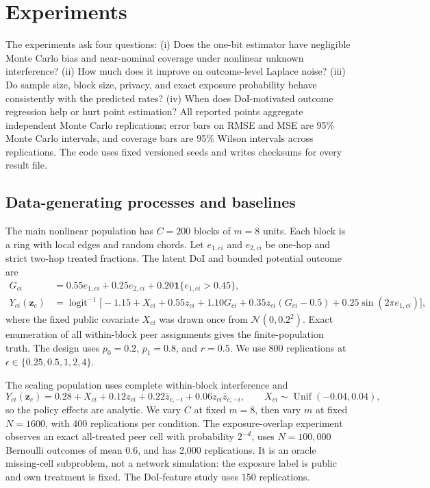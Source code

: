 \documentclass[10pt]{article}
\theoremstyle{definition}
\theoremstyle{remark}
\newcommand{\ind}{\mathbf{1}}
\begin{document}
\section{Experiments}
\label{sec:experiments}

The experiments ask four questions: (i) Does the one-bit estimator have negligible Monte Carlo
bias and near-nominal coverage under nonlinear unknown interference? (ii) How much does
it improve on outcome-level Laplace noise? (iii) Do sample size, block size, privacy, and exact
exposure probability behave consistently with the predicted rates? (iv) When does
DoI-motivated outcome regression help or hurt point estimation?
All reported points aggregate independent Monte Carlo replications; error bars on RMSE and MSE
are 95\% Monte Carlo intervals, and coverage bars are 95\% Wilson intervals across
replications. The code uses fixed versioned seeds and writes checksums for every result file.

\subsection{Data-generating processes and baselines}

The main nonlinear population has $C=200$ blocks of $m=8$ units. Each block is a ring with
local edges and random chords. Let $e_{1,ci}$ and $e_{2,ci}$ be one-hop and strict two-hop
treated fractions. The latent DoI and bounded potential outcome are
\begin{align*}
  G_{ci}&=0.55e_{1,ci}+0.25e_{2,ci}+0.20\ind\{e_{1,ci}>0.45\},\\
  Y_{ci}(\mathbf z_c)&=\operatorname{logit}^{-1}\bigl[
  -1.15+X_{ci}+0.55z_{ci}+1.10G_{ci}
  +0.35z_{ci}(G_{ci}-0.5)+0.25\sin(2\pi e_{1,ci})\bigr],
\end{align*}
where the fixed public covariate $X_{ci}$ was drawn once from $\mathcal N(0,0.2^2)$. Exact
enumeration of all within-block peer assignments gives the finite-population truth. The design
uses $p_0=0.2$, $p_1=0.8$, and $r=0.5$. We use 800 replications at
$\epsilon\in\{0.25,0.5,1,2,4\}$.

The scaling population uses complete within-block interference and
\[
  Y_{ci}(\mathbf z_c)=0.28+X_{ci}+0.12z_{ci}+0.22\bar z_{c,-i}
  +0.06z_{ci}\bar z_{c,-i}, \qquad X_{ci}\sim\operatorname{Unif}(-0.04,0.04),
\]
so the policy effects are analytic. We vary $C$ at fixed $m=8$, then vary $m$ at fixed
$N=1600$, with 400 replications per condition. The exposure-overlap experiment observes an
exact all-treated peer cell with probability $2^{-d}$, uses $N=100{,}000$ Bernoulli outcomes
of mean $0.6$, and has 2,000 replications. It is an oracle missing-cell subproblem, not a
network simulation: the exposure label is public and own treatment is fixed. The
DoI-feature study uses 150 replications.
\end{document}
